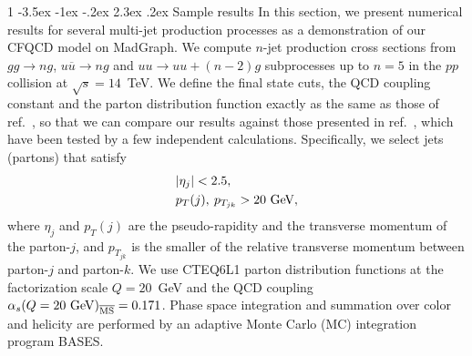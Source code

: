 \documentclass[a4paper,11pt]{article}
\makeatletter
\renewcommand{\section}{%
  \@startsection{section}%
   {1}%
   {\z@}%
   {-3.5ex \@plus -1ex \@minus -.2ex}%
   {2.3ex \@plus.2ex}%
   {\normalfont\large\bfseries}%
}%
\makeatother
\begin{document}
\section{Sample results}
In this section, we present numerical results for several
 multi-jet production processes as a demonstration of our
 CFQCD model on MadGraph. We compute $n$-jet production cross sections from
 $gg\rightarrow ng$, $u\overline{u}\rightarrow ng$ and
 $uu\rightarrow uu+(n-2)g$ subprocesses
 up to $n=5$ in the $pp$ collision at $\sqrt{s}=14$~TeV.
 We define the final state cuts, the QCD coupling constant
 and the parton distribution function exactly as the same
 as those of ref.~\cite{GPU2}, so that we can compare our results
 against those presented in ref.~\cite{GPU2}, which have been
 tested by a few independent calculations.
 Specifically, we select jets (partons) that satisfy
 \begin{subequations}
  \begin{align}
 \label{jet-cuts}
 &|\eta_j| < 2.5,\\
   &p_T(j),\: p_{T_{jk}} > 20~{\mbox{\rm GeV}},
 \end{align}
 \end{subequations}
 where $\eta_j$ and $p_T(j)$ are the pseudo-rapidity and
 the transverse momentum of the parton-$j$,
 and $p_{T_{jk}}$ is the smaller of the relative transverse
 momentum between parton-$j$ and parton-$k$.
 We use CTEQ6L1 parton distribution functions\cite{CTEQ6L1}
 at the factorization scale $Q=20$~GeV and the QCD coupling
 $\alpha_s(Q=20~{\rm GeV})_{\overline{{\rm MS}}}=0.171$.
 Phase space integration and summation over color and helicity
 are performed by an adaptive Monte Carlo (MC) integration
 program BASES\cite{BASES}.
\end{document}
